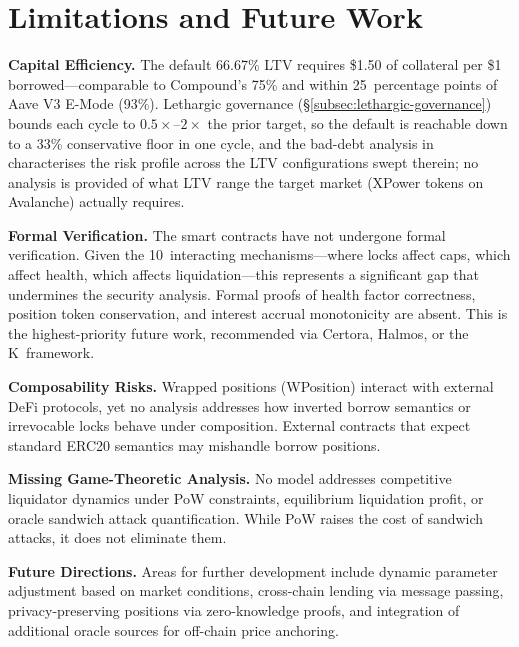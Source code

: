 \documentclass[10pt,a4paper,twocolumn]{article}
\begin{document}
\section{Limitations and Future Work}
\label{sec:limitations}

\textbf{Capital Efficiency.} The default 66.67\% LTV requires \$1.50 of collateral per \$1 borrowed---comparable to Compound's 75\% and within 25~percentage points of Aave V3 E-Mode (93\%). Lethargic governance (\S\ref{subsec:lethargic-governance}) bounds each cycle to $0.5\times$--$2\times$ the prior target, so the default is reachable down to a 33\% conservative floor in one cycle, and the bad-debt analysis in \cite{sim} characterises the risk profile across the LTV configurations swept therein; no analysis is provided of what LTV range the target market (XPower tokens on Avalanche) actually requires.

\textbf{Formal Verification.} The smart contracts have not undergone formal verification. Given the 10~interacting mechanisms---where locks affect caps, which affect health, which affects liquidation---this represents a significant gap that undermines the security analysis. Formal proofs of health factor correctness, position token conservation, and interest accrual monotonicity are absent. This is the highest-priority future work, recommended via Certora, Halmos, or the K~framework.

\textbf{Composability Risks.} Wrapped positions (WPosition) interact with external DeFi protocols, yet no analysis addresses how inverted borrow semantics or irrevocable locks behave under composition. External contracts that expect standard ERC20 semantics may mishandle borrow positions.

\textbf{Missing Game-Theoretic Analysis.} No model addresses competitive liquidator dynamics under PoW constraints, equilibrium liquidation profit, or oracle sandwich attack quantification. While PoW raises the cost of sandwich attacks, it does not eliminate them.

\textbf{Future Directions.} Areas for further development include dynamic parameter adjustment based on market conditions, cross-chain lending via message passing, privacy-preserving positions via zero-knowledge proofs, and integration of additional oracle sources for off-chain price anchoring.
\end{document}
